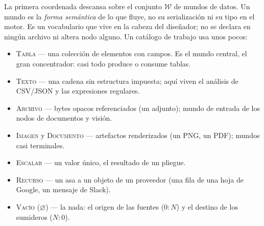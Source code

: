 \documentclass[11pt,a4paper]{article}
\theoremstyle{definition}
\theoremstyle{plain}
\newcommand{\mundo}[1]{\textsc{#1}}   %
\begin{document}
La primera coordenada descansa sobre el conjunto $\mathcal{W}$ de mundos de datos.
Un mundo es la \emph{forma semántica} de lo que fluye, no su serialización ni su
tipo en el motor. Es un vocabulario que vive en la cabeza del diseñador; no se
declara en ningún archivo ni altera nodo alguno. Un catálogo de trabajo usa unos
pocos:

\begin{itemize}[leftmargin=1.4em]
  \item \mundo{Tabla} --- una colección de elementos con campos. Es el mundo central,
        el gran concentrador: casi todo produce o consume tablas.
  \item \mundo{Texto} --- una cadena sin estructura impuesta; aquí viven el análisis
        de CSV/JSON y las expresiones regulares.
  \item \mundo{Archivo} --- bytes opacos referenciados (un adjunto); mundo de
        entrada de los nodos de documentos y visión.
  \item \mundo{Imagen} y \mundo{Documento} --- artefactos renderizados (un PNG, un
        PDF); mundos casi terminales.
  \item \mundo{Escalar} --- un valor único, el resultado de un pliegue.
  \item \mundo{Recurso} --- un asa a un objeto de un proveedor (una fila de una hoja
        de Google, un mensaje de Slack).
  \item \mundo{Vacío} ($\varnothing$) --- la nada: el origen de las fuentes ($0{:}N$)
        y el destino de los sumideros ($N{:}0$).
\end{itemize}
\end{document}
